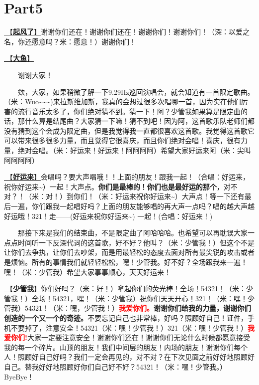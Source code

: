 \documentclass[]{ctexbook}
\begin{document}
\section{Part5}\label{LasVegas-20250228-part5}

\hyperref[the-wind-rises]{🎵【\textbf{起风了}】}谢谢你们还在！谢谢你们还在！谢谢你们！谢谢你们！（深：以爱之名，你还愿意吗？米：愿意！）谢谢你们！

\hyperref[big-fish]{🎵【\textbf{大鱼}】}

  谢谢大家！

  欸，大家，如果稍微了解一下9.29Hz巡回演唱会，就会知道有一首限定歌曲。（米：Wuo\textasciitilde\textasciitilde\textasciitilde)来拉斯维加斯，我真的会想过很多次唱哪一首，因为实在他们厉害的流行音乐太多了，你们绝对猜不到。猜一下！阿？少管我如果算是限定曲的话，那什么算是结尾曲？大家猜一下嘛！猜不到吧！因为阿，这首歌乐队老师们都没有猜到这个会成为限定曲，但是我觉得我一直都很喜欢这首歌。我觉得这首歌它可以带来很多很多力量，而且觉得它很喜庆，而且你们绝对会唱！喜庆，很有力量，绝对会唱。（米：好运来！好运来！阿阿阿阿）希望大家好运来阿（米：尖叫阿阿阿阿）

\hyperref[good-luck-comes]{🎵【\textbf{好运来}】}会唱吗？要大声唱哦！！上面的朋友！跟我一起！（合唱：好运来，祝你好运来\textasciitilde）一起！大声点。\textbf{你们是最棒的！你们也是最好运的那个}，对不对？！（米：对！）到你们！（米：好运来祝你好运来\textasciitilde）大声点！等一下还有最后一遍，你们跟我一起唱好吗？上面的朋友能够唱的再大声一点吗？唱的越大声越好运哦！321！走------(好运来祝你好运来\textasciitilde) 一起！(合唱：好运来！)

  那接下来是我们的结束曲，不是限定曲了阿哈哈哈。也希望可以再耽误大家一点点时间听一下反深代词的这首歌，好不好？他叫？（米：少管我！）但这个不是让你们去争执，让你们去吵架，而是用最轻松的态度去面对所有最尖锐的攻击或者是烦恼。所有的事情我们就轻轻松松，嘿！少管我。好不好？全场跟我来一遍！嘿！（米：少管我）希望大家事事顺心，天天好运来！

\hyperref[watch-ur-manners]{🎵【\textbf{少管我}】}你们好吗？（米：好！）拿起你们的荧光棒！全场！54321！（米：少管我！）全场！54321，嘿！（米：少管我）祝你们天天开心！321！（米：嘿！少管我）54321！（米：嘿，少管我！）\textbf{\textcolor{red}{我爱你们。}谢谢你们给我的力量，谢谢你们创造的一个又一个的奇迹。}不要忘记自己也非常棒，好吗？照顾好自己！证件，手机不要掉了，注意安全！54321（米：嘿！少管我！）321（米：嘿！少管我！）\textbf{\textcolor{red}{我爱你们!}}大家一定要注意安全！谢谢你们还在！谢谢你们无论什么时候都愿意接受我的每一个碎片。山顶的朋友！我们中间层的朋友！内场的朋友！谢谢你们每个人！照顾好自己好吗？我们一定会再见的，对不对？在下次见面之前好好地照顾好自己。替我好好地照顾好你们自己好不好？54321！（米：嘿！少管我。）ByeBye！
\end{document}
